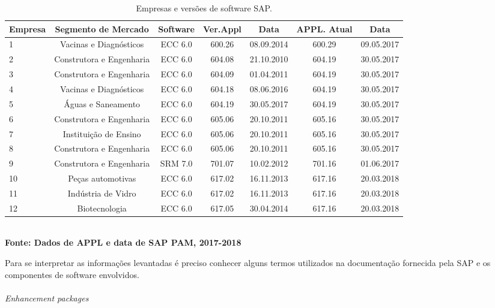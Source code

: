 \begin{table}[htb]
	\centering
	\caption{\hspace{0.1cm} Empresas e versões de software SAP.}
	\vspace{-0.3cm} %
	\label{tab:tabela1}
	\begin{tabular}{l|c|c|c|c|c|c}
		\hline
		\textbf{Empresa}	& \textbf{Segmento de Mercado} & \textbf{Software}	& \textbf{Ver.Appl}	& \textbf{Data}& \textbf{APPL. Atual} & \textbf{Data}
		\\
		\hline
		1	& Vacinas e Diagnósticos        & ECC 6.0	& 600.26	& 08.09.2014	& 600.29 & 09.05.2017\\
		2	& Construtora e Engenharia      & ECC 6.0	& 604.08	& 21.10.2010	& 604.19 & 30.05.2017\\
		3	& Construtora e Engenharia      & ECC 6.0	& 604.09	& 01.04.2011	& 604.19 & 30.05.2017\\
		4	& Vacinas e Diagnósticos        & ECC 6.0	& 604.18	& 08.06.2016	& 604.19 & 30.05.2017\\
		5	& Águas e Saneamento            & ECC 6.0	& 604.19	& 30.05.2017	& 604.19 & 30.05.2017\\
		6	& Construtora e Engenharia      & ECC 6.0	& 605.06	& 20.10.2011	& 605.16 & 30.05.2017\\
		7	& Instituição de Ensino         & ECC 6.0	& 605.06	& 20.10.2011	& 605.16 & 30.05.2017\\
		8	& Construtora e Engenharia      & ECC 6.0	& 605.06	& 20.10.2011	& 605.16 & 30.05.2017\\
		9	& Construtora e Engenharia      & SRM 7.0	& 701.07	& 10.02.2012	& 701.16 & 01.06.2017\\
		10	& Peças automotivas             & ECC 6.0	& 617.02	& 16.11.2013	& 617.16 & 20.03.2018\\
		11	& Indústria de Vidro            & ECC 6.0	& 617.02	& 16.11.2013	& 617.16 & 20.03.2018\\
		12	& Biotecnologia                 & ECC 6.0	& 617.05	& 30.04.2014	& 617.16 & 20.03.2018\\

		\hline
	\end{tabular}
	\vspace{.1cm}  %
	\small
	{\footnotesize\\ \textbf{Fonte: Dados de APPL e data de SAP PAM, 2017-2018}}
\end{table}

Para se interpretar as informações levantadas é preciso conhecer alguns termos utilizados na documentação fornecida pela SAP e os componentes de software envolvidos.\\\\
\textit{Enhancement packages}\\

